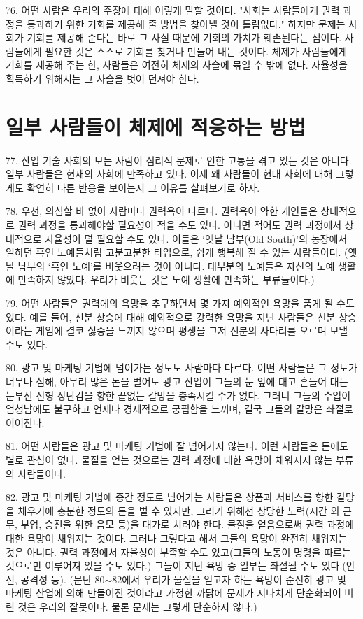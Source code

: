 \documentclass[11pt,a4paper]{article}
\begin{document}
\begin{multicols}{2}
76. 어떤 사람은 우리의 주장에 대해 이렇게 말할 것이다. "사회는 사람들에게 권력 과정을 통과하기 위한 기회를 제공해 줄 방법을 찾아낼 것이 틀림없다." 하지만 문제는 사회가 기회를 제공해 준다는 바로 그  사실 때문에 기회의 가치가 훼손된다는 점이다. 사람들에게 필요한 것은 스스로 기회를 찾거나 만들어  내는 것이다. 체제가 사람들에게 기회를 제공해 주는 한, 사람들은 여전히 체제의 사슬에 묶일 수 밖에  없다. 자율성을 획득하기 위해서는 그 사슬을 벗어 던져야 한다. 


\section*{일부 사람들이 체제에 적응하는 방법} 
77. 산업-기술 사회의 모든 사람이 심리적 문제로 인한 고통을 겪고 있는 것은 아니다. 일부 사람들은  현재의 사회에 만족하고 있다. 이제 왜 사람들이 현대 사회에 대해 그렇게도 확연히 다른 반응을 보이는지 그 이유를 살펴보기로 하자. 


78. 우선, 의심할 바 없이 사람마다 권력욕이 다르다. 권력욕이 약한 개인들은 상대적으로 권력 과정을  통과해야할 필요성이 적을 수도 있다. 아니면 적어도 권력 과정에서 상대적으로 자율성이 덜 필요할 수도  있다. 이들은 `옛날 남부(Old South)'의 농장에서 일하던 흑인 노예들처럼 고분고분한 타입으로, 쉽게  행복해 질 수 있는 사람들이다. (옛날 남부의 `흑인 노예'를 비웃으려는 것이 아니다. 대부분의 노예들은  자신의 노예 생활에 만족하지 않았다. 우리가 비웃는 것은 노예 생활에 만족하는 부류들이다.)  


79. 어떤 사람들은 권력에의 욕망을 추구하면서 몇 가지 예외적인 욕망을 품게 될 수도 있다. 예를 들어,  신분 상승에 대해 예외적으로 강력한 욕망을 지닌 사람들은 신분 상승이라는 게임에 결코 싫증을 느끼지  않으며 평생을 그저 신분의 사다리를 오르며 보낼 수도 있다.  


80. 광고 및 마케팅 기법에 넘어가는 정도도 사람마다 다르다. 어떤 사람들은 그 정도가 너무나 심해,  아무리 많은 돈을 벌어도 광고 산업이 그들의 눈 앞에 대고 흔들어 대는 눈부신 신형 장난감을 향한  끝없는 갈망을 충족시킬 수가 없다. 그러니 그들의 수입이 엄청남에도 불구하고 언제나 경제적으로  궁핍함을 느끼며, 결국 그들의 갈망은 좌절로 이어진다.


81. 어떤 사람들은 광고 및 마케팅 기법에 잘 넘어가지 않는다. 이런 사람들은 돈에도 별로 관심이 없다.  물질을 얻는 것으로는 권력 과정에 대한 욕망이 채워지지 않는 부류의 사람들이다.  


82. 광고 및 마케팅 기법에 중간 정도로 넘어가는 사람들은 상품과 서비스를 향한 갈망을 채우기에  충분한 정도의 돈을 벌 수 있지만, 그러기 위해선 상당한 노력(시간 외 근무, 부업, 승진을 위한 음모 등)을 대가로 치러야 한다. 물질을 얻음으로써 권력 과정에 대한 욕망이 채워지는 것이다. 그러나 그렇다고 해서 그들의 욕망이 완전히 채워지는 것은 아니다. 권력 과정에서 자율성이 부족할 수도 있고(그들의 노동이  명령을 따르는 것으로만 이루어져 있을 수도 있다.) 그들이 지닌 욕망 중 일부는 좌절될 수도 있다.(안전,  공격성 등). (문단 80${\sim}$82에서 우리가 물질을 얻고자 하는 욕망이 순전히 광고 및 마케팅 산업에 의해  만들어진 것이라고 가정한 까닭에 문제가 지나치게 단순화되어 버린 것은 우리의 잘못이다. 물론 문제는  그렇게 단순하지 않다.)  



\end{multicols}
\end{document}
